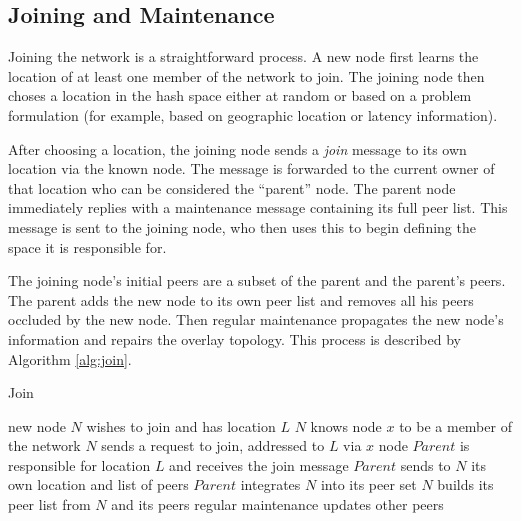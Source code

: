 
\subsection{Joining and Maintenance}
Joining the network is a straightforward process. A new node first learns the location of at least one member of the network to join. The joining node then choses a location in the hash space either at random or based on a problem formulation (for example, based on geographic location or latency information).

After choosing a location, the joining node sends a \textit{join} message to its own location via the known node.
The message is forwarded to the current owner of that location who can be considered the ``parent'' node.
The parent node immediately replies with a maintenance message containing its full peer list. 
This message is sent to the joining node, who then uses this to begin defining the space it is responsible for. 

The joining node's initial peers are a subset of the parent and the parent's peers. The parent adds the new node to its own peer list and removes all his peers occluded by the new node.  Then regular maintenance propagates the new node's information and repairs the overlay topology.  This process is described by Algorithm \ref{alg:join}.


\begin{algorithm}
	\caption{Join}
	\label{alg:join}
	\begin{algorithmic}[1]  %
		\State new node $N$ wishes to join and has location $L$
		\State  $N$ knows node $x$ to be a member of the network
		\State  $N$ sends a request to join, addressed to $L$ via $x$
		\State  node $Parent$ is responsible for location $L$ and receives the join message
		\State  $Parent$ sends to $N$ its own location and list of peers
		\State  $Parent$ integrates $N$ into its peer set
		\State  $N$ builds its peer list from $N$ and its peers
		\State regular maintenance updates other peers
	\end{algorithmic}
\end{algorithm}


